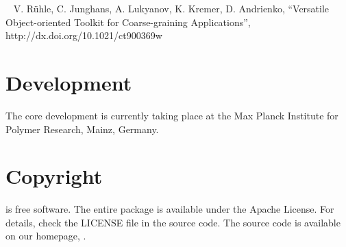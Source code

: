 \vspace{0.1cm}
\noindent
~\cite{ruhle_versatile_2009} V. R\"uhle, C. Junghans, A. Lukyanov, K. Kremer, D. Andrienko, 
``Versatile Object-oriented Toolkit for Coarse-graining Applications'',
{http://dx.doi.org/10.1021/ct900369w}

\section*{Development}
The core development is currently taking place at the Max Planck Institute for Polymer Research, Mainz, Germany.

\section*{Copyright}
\votcactp is free software. The entire package is available under the Apache License. For details, check
the LICENSE file in the source code. The \votcactp source code is available on our homepage, .

\vfill
